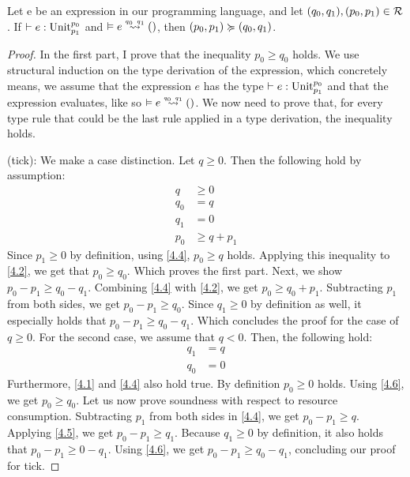 \begin{theorem}\label{thm:soundness-let-tick}
   Let e be an expression in our programming language, and let \((q_0, q_1), (p_0, p_1) \in \mathcal{R}\). 
   \center If \(\vdash e : \text{Unit} ^{p_0}_{p_1}\) and \(\evals{}{e}{()}{q_0}{q_1}\), then \((p_0, p_1) \succcurlyeq (q_0, q_1)\).
\end{theorem}

\begin{proof}
In the first part, I prove that the inequality \(p_0 \geq q_0\) holds. We use structural induction on the type derivation of the expression, which concretely means, we assume that the expression \(e\) has the type \(\vdash e : \text{Unit} ^{p_0}_{p_1}\) and that the expression evaluates, like so \(\evals{}{e}{()}{q_0}{q_1}\). We now need to prove that, for every type rule that could be the last rule applied in a type derivation, the inequality holds.

   (tick): We make a case distinction. Let \(q \geq 0\). Then the following hold by assumption:
   \begin{align}
      q     &\geq 0 \label{4.1}\\
      q_0   &= q \label{4.2}\\
      q_1   &= 0 \label{4.3}\\
      p_0   &\geq q + p_1 \label{4.4}
   \end{align}
   Since \(p_1 \geq 0\) by definition, using \ref{4.4}, \(p_0 \geq q\) holds. Applying this inequality to \ref{4.2}, we get that \(p_0 \geq q_0\). Which proves the first part.
   Next, we show \(p_0 - p_1 \geq q_0 - q_1\). Combining \ref{4.4} with \ref{4.2}, we get \(p_0 \geq q_0 + p_1\). Subtracting \(p_1\) from both sides, we get \(p_0 - p_1 \geq q_0\). Since \(q_1 \geq 0\) by definition as well, it especially holds that \(p_0 - p_1 \geq q_0 - q_1\). Which concludes the proof for the case of \(q \geq 0\).
   For the second case, we assume that \(q < 0\). Then, the following hold:
   \begin{align}
      q_1   &= q \label{4.5}\\
      q_0   &= 0 \label{4.6}
   \end{align}
   Furthermore, \ref{4.1} and \ref{4.4} also hold true. By definition \(p_0 \geq 0\) holds. Using \ref{4.6}, we get \(p_0 \geq q_0\). 
   Let us now prove soundness with respect to resource consumption. Subtracting \(p_1\) from both sides in \ref{4.4}, we get \(p_0 - p_1 \geq q \). Applying \cref{4.5}, we get \(p_0 - p_1 \geq q_1\). Because \(q_1 \geq 0\) by definition, it also holds that \(p_0 - p_1 \geq 0 - q_1\). Using \ref{4.6}, we get \(p_0 - p_1 \geq q_0 - q_1\), concluding our proof for tick.


\end{proof}
